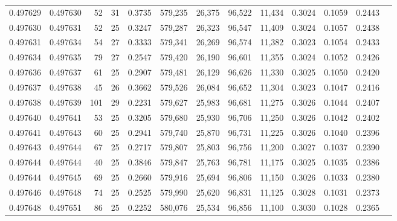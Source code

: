 \begin{tabular}{rrrrrrrrrrrrr}
0.497629 & 0.497630 &  52 &  31 &                                     0.3735 & 579,235 &  26,375 &  96,522 &  11,434 & 0.3024 & 0.1059 & 0.2443 \\
0.497630 & 0.497631 &  52 &  25 &                                     0.3247 & 579,287 &  26,323 &  96,547 &  11,409 & 0.3024 & 0.1057 & 0.2438 \\
0.497631 & 0.497634 &  54 &  27 &                                     0.3333 & 579,341 &  26,269 &  96,574 &  11,382 & 0.3023 & 0.1054 & 0.2433 \\
0.497634 & 0.497635 &  79 &  27 &                                     0.2547 & 579,420 &  26,190 &  96,601 &  11,355 & 0.3024 & 0.1052 & 0.2426 \\
0.497636 & 0.497637 &  61 &  25 &                                     0.2907 & 579,481 &  26,129 &  96,626 &  11,330 & 0.3025 & 0.1050 & 0.2420 \\
0.497637 & 0.497638 &  45 &  26 &                                     0.3662 & 579,526 &  26,084 &  96,652 &  11,304 & 0.3023 & 0.1047 & 0.2416 \\
0.497638 & 0.497639 & 101 &  29 &                                     0.2231 & 579,627 &  25,983 &  96,681 &  11,275 & 0.3026 & 0.1044 & 0.2407 \\
0.497640 & 0.497641 &  53 &  25 &                                     0.3205 & 579,680 &  25,930 &  96,706 &  11,250 & 0.3026 & 0.1042 & 0.2402 \\
0.497641 & 0.497643 &  60 &  25 &                                     0.2941 & 579,740 &  25,870 &  96,731 &  11,225 & 0.3026 & 0.1040 & 0.2396 \\
0.497643 & 0.497644 &  67 &  25 &                                     0.2717 & 579,807 &  25,803 &  96,756 &  11,200 & 0.3027 & 0.1037 & 0.2390 \\
0.497644 & 0.497644 &  40 &  25 &                                     0.3846 & 579,847 &  25,763 &  96,781 &  11,175 & 0.3025 & 0.1035 & 0.2386 \\
0.497644 & 0.497645 &  69 &  25 &                                     0.2660 & 579,916 &  25,694 &  96,806 &  11,150 & 0.3026 & 0.1033 & 0.2380 \\
0.497646 & 0.497648 &  74 &  25 &                                     0.2525 & 579,990 &  25,620 &  96,831 &  11,125 & 0.3028 & 0.1031 & 0.2373 \\
0.497648 & 0.497651 &  86 &  25 &                                     0.2252 & 580,076 &  25,534 &  96,856 &  11,100 & 0.3030 & 0.1028 & 0.2365 \\

\end{tabular}
